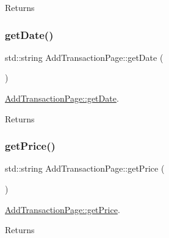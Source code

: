 \begin{DoxyReturn}{Returns}

\end{DoxyReturn}
\mbox{\label{class_add_transaction_page_a7c6a8d3a13aebb698413b08e28baf1ab}} 
\subsubsection{\texorpdfstring{get\+Date()}{getDate()}}
{\footnotesize\ttfamily std\+::string Add\+Transaction\+Page\+::get\+Date (\begin{DoxyParamCaption}{ }\end{DoxyParamCaption})}



\mbox{\hyperlink{class_add_transaction_page_a7c6a8d3a13aebb698413b08e28baf1ab}{Add\+Transaction\+Page\+::get\+Date}}. 

\begin{DoxyReturn}{Returns}

\end{DoxyReturn}
\mbox{\label{class_add_transaction_page_a2fa90d880190417bbf223ef8c73d797b}} 
\subsubsection{\texorpdfstring{get\+Price()}{getPrice()}}
{\footnotesize\ttfamily std\+::string Add\+Transaction\+Page\+::get\+Price (\begin{DoxyParamCaption}{ }\end{DoxyParamCaption})}



\mbox{\hyperlink{class_add_transaction_page_a2fa90d880190417bbf223ef8c73d797b}{Add\+Transaction\+Page\+::get\+Price}}. 

\begin{DoxyReturn}{Returns}

\end{DoxyReturn}
\mbox{\label{class_add_transaction_page_a82f790ea61da26f20e03d835d432a841}} 
